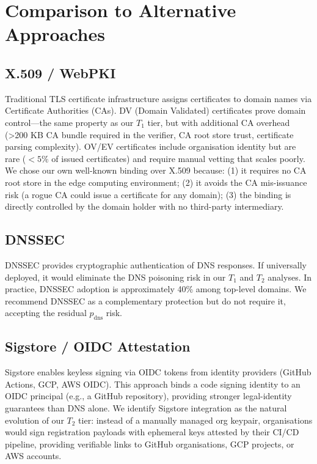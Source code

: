 \documentclass[conference]{IEEEtran}
\begin{document}
\section{Comparison to Alternative Approaches}
\label{sec:comparison}

\subsection{X.509 / WebPKI}

Traditional TLS certificate infrastructure assigns
certificates to domain names via Certificate Authorities
(CAs).  DV (Domain Validated) certificates prove domain
control—the same property as our $T_1$ tier, but with
additional CA overhead (>200 KB CA bundle required in the
verifier, CA root store trust, certificate parsing
complexity).  OV/EV certificates include organisation
identity but are rare ($<5\%$ of issued certificates) and
require manual vetting that scales poorly.  We chose our
own well-known binding over X.509 because: (1) it requires
no CA root store in the edge computing environment; (2) it
avoids the CA mis-issuance risk (a rogue CA could issue
a certificate for any domain); (3) the binding is directly
controlled by the domain holder with no third-party
intermediary.

\subsection{DNSSEC}

DNSSEC provides cryptographic authentication of DNS
responses. If universally deployed, it would eliminate the
DNS poisoning risk in our $T_1$ and $T_2$ analyses. In
practice, DNSSEC adoption is approximately 40\% among
top-level domains.  We recommend DNSSEC as a complementary
protection but do not require it, accepting the residual
$p_{\text{dns}}$ risk.

\subsection{Sigstore / OIDC Attestation}

Sigstore \cite{sigstore2021} enables keyless signing via
OIDC tokens from identity providers (GitHub Actions, GCP,
AWS OIDC).  This approach binds a code signing identity to
an OIDC principal (e.g., a GitHub repository), providing
stronger legal-identity guarantees than DNS alone.  We
identify Sigstore integration as the natural evolution of
our $T_2$ tier: instead of a manually managed org keypair,
organisations would sign registration payloads with
ephemeral keys attested by their CI/CD pipeline, providing
verifiable links to GitHub organisations, GCP projects, or
AWS accounts.
\end{document}
